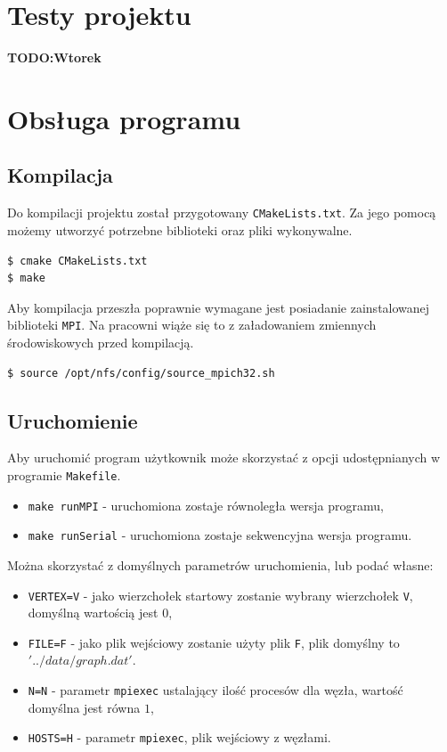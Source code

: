 \documentclass[12pt]{article}
\begin{document}
\section{Testy projektu}
\textbf{TODO:Wtorek}

\section{Obsługa programu}
\subsection{Kompilacja}
Do kompilacji projektu został przygotowany \lstinline|CMakeLists.txt|. Za jego pomocą możemy utworzyć potrzebne biblioteki oraz pliki wykonywalne.

\begin{lstlisting}[caption={Kompilacja programu.}, captionpos=b ]
$ cmake CMakeLists.txt
$ make
\end{lstlisting}

Aby kompilacja przeszła poprawnie wymagane jest posiadanie zainstalowanej biblioteki \lstinline|MPI|. Na pracowni wiąże się to z załadowaniem zmiennych środowiskowych przed kompilacją.

\begin{lstlisting}[caption={Skonfigurowanie dostępu do pakietu MPI na pracowni.}, captionpos=b ]
$ source /opt/nfs/config/source_mpich32.sh
\end{lstlisting}

\subsection{Uruchomienie} \label{sec:uru}

Aby uruchomić program użytkownik może skorzystać z opcji udostępnianych w programie \lstinline|Makefile|. 
\begin{itemize}
\item  \lstinline|make runMPI| - uruchomiona zostaje równoległa wersja programu,
\item  \lstinline|make runSerial| - uruchomiona zostaje sekwencyjna wersja programu.
\end{itemize}

Można skorzystać z domyślnych parametrów uruchomienia, lub podać własne:
\begin{itemize}
\item  \lstinline|VERTEX=V| - jako wierzchołek startowy zostanie wybrany wierzchołek \lstinline|V|, domyślną wartością jest $0$,
\item  \lstinline|FILE=F| - jako plik wejściowy zostanie użyty plik \lstinline|F|, plik domyślny to $'../data/graph.dat'$.
\item  \lstinline|N=N| - parametr \lstinline|mpiexec| ustalający ilość procesów dla węzła, wartość domyślna jest równa $1$,
\item  \lstinline|HOSTS=H| -  parametr \lstinline|mpiexec|, plik wejściowy z węzłami.
\end{itemize}
\end{document}
